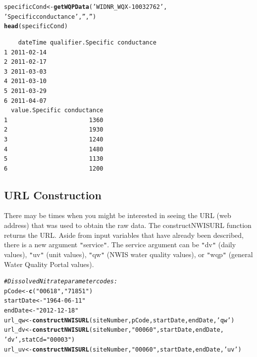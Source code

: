 \documentclass[a4paper,11pt]{article}\usepackage[]{graphicx}\usepackage[]{color}
\makeatletter
\newcommand{\hlstr}[1]{\textcolor[rgb]{0.192,0.494,0.8}{#1}}%
\newcommand{\hlcom}[1]{\textcolor[rgb]{0.678,0.584,0.686}{\textit{#1}}}%
\newcommand{\hlstd}[1]{\textcolor[rgb]{0.345,0.345,0.345}{#1}}%
\newcommand{\hlkwb}[1]{\textcolor[rgb]{0.69,0.353,0.396}{#1}}%
\newcommand{\hlkwc}[1]{\textcolor[rgb]{0.333,0.667,0.333}{#1}}%
\newcommand{\hlkwd}[1]{\textcolor[rgb]{0.737,0.353,0.396}{\textbf{#1}}}%
\newenvironment{kframe}{%
 \def\at@end@of@kframe{}%
 \ifinner\ifhmode%
  \def\at@end@of@kframe{\end{minipage}}%
  \begin{minipage}{\columnwidth}%
 \fi\fi%
 \def\FrameCommand##1{\hskip\@totalleftmargin \hskip-\fboxsep
 \colorbox{shadecolor}{##1}\hskip-\fboxsep
     \hskip-\linewidth \hskip-\@totalleftmargin \hskip\columnwidth}%
 \MakeFramed {\advance\hsize-\width
   \@totalleftmargin\z@ \linewidth\hsize
   \@setminipage}}%
 {\par\unskip\endMakeFramed%
 \at@end@of@kframe}
\newenvironment{knitrout}{}{} %
\makeatother
\begin{document}
\begin{knitrout}
\color{fgcolor}\begin{kframe}
\begin{alltt}
\hlstd{specificCond} \hlkwb{<-} \hlkwd{getWQPData}\hlstd{(}\hlstr{'WIDNR_WQX-10032762'}\hlstd{,}
        \hlstr{'Specific conductance'}\hlstd{,} \hlstr{''}\hlstd{,} \hlstr{''}\hlstd{)}
\hlkwd{head}\hlstd{(specificCond)}
\end{alltt}
\begin{verbatim}
    dateTime qualifier.Specific conductance
1 2011-02-14                               
2 2011-02-17                               
3 2011-03-03                               
4 2011-03-10                               
5 2011-03-29                               
6 2011-04-07                               
  value.Specific conductance
1                       1360
2                       1930
3                       1240
4                       1480
5                       1130
6                       1200
\end{verbatim}
\end{kframe}
\end{knitrout}


\FloatBarrier
\subsection{URL Construction}
\label{sec:usgsURL}
There may be times when you might be interested in seeing the URL (web address) that was used to obtain the raw data. The constructNWISURL function returns the URL.  Aside from input variables that have already been described, there is a new argument \texttt{"}service\texttt{"}. The service argument can be \texttt{"}dv\texttt{"} (daily values), \texttt{"}uv\texttt{"} (unit values), \texttt{"}qw\texttt{"} (NWIS water quality values), or \texttt{"}wqp\texttt{"} (general Water Quality Portal values).
 

\begin{knitrout}
\color{fgcolor}\begin{kframe}
\begin{alltt}
\hlcom{# Dissolved Nitrate parameter codes:}
\hlstd{pCode} \hlkwb{<-} \hlkwd{c}\hlstd{(}\hlstr{"00618"}\hlstd{,}\hlstr{"71851"}\hlstd{)}
\hlstd{startDate} \hlkwb{<-} \hlstr{"1964-06-11"}
\hlstd{endDate} \hlkwb{<-} \hlstr{"2012-12-18"}
\hlstd{url_qw} \hlkwb{<-} \hlkwd{constructNWISURL}\hlstd{(siteNumber,pCode,startDate,endDate,}\hlstr{'qw'}\hlstd{)}
\hlstd{url_dv} \hlkwb{<-} \hlkwd{constructNWISURL}\hlstd{(siteNumber,}\hlstr{"00060"}\hlstd{,startDate,endDate,}
                           \hlstr{'dv'}\hlstd{,}\hlkwc{statCd}\hlstd{=}\hlstr{"00003"}\hlstd{)}
\hlstd{url_uv} \hlkwb{<-} \hlkwd{constructNWISURL}\hlstd{(siteNumber,}\hlstr{"00060"}\hlstd{,startDate,endDate,}\hlstr{'uv'}\hlstd{)}
\end{alltt}
\end{kframe}
\end{knitrout}
\end{document}
